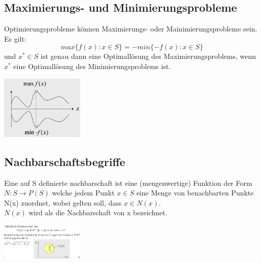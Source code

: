 \documentclass{report}
\newenvironment{Figure}
	{\par\medskip\noindent\minipage{\linewidth}}
	{\endminipage\par\medskip}
\theoremstyle{definition}
\theoremstyle{example}
\begin{document}
   \subsection{Maximierungs- und Minimierungsprobleme}
Optimierungsprobleme können Maximierungs- oder Mainimierungsprobleme sein. Es gilt:
\begin{equation}
   max \{f(x) : x \in S \} = - min \{-f(x): x \in S \}
\end{equation}
und $x^* \in S$ ist genau dann eine Optimallösung des Maximierungsproblems, wenn $x^*$ eine Optimallösung des Minimierungsproblems ist.
\begin{Figure}
\centering
\includegraphics[width=150px]{img/MinMax.png}
	\label{fig:Abbildung der Min-Max-Optimierung}
\end{Figure}

   \subsection{Nachbarschaftsbegriffe}
Eine auf S definierte nachbarschaft ist eine (mengenwertige) Funktion der Form $N: S \rightarrow P(S)$ welche jedem Punkt $x \in S$ eine Menge von benachbarten Punkte N(x) zuordnet, wobei gelten soll, dass $x \in N(x)$.\\
$N(x)$ wird als die Nachbarschaft von x bezeichnet.

\begin{Figure}
\centering
\includegraphics[width=150px]{img/euklidischeNachbarschaft.png}
	\label{fig:Abbildung der euklidische Nachbarschaft}
\end{Figure}
\end{document}
